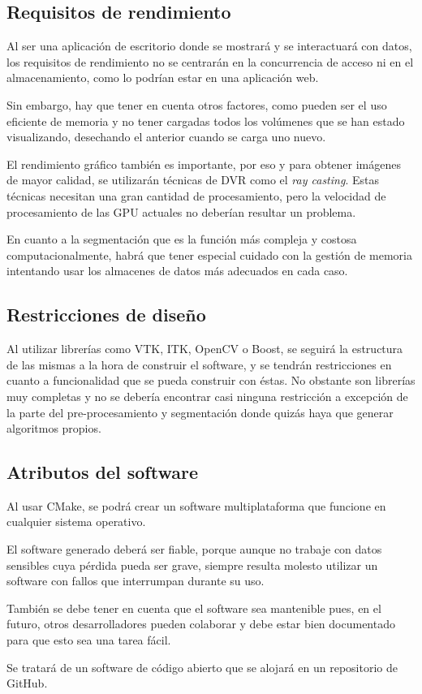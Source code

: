 \subsection{Requisitos de rendimiento}

Al ser una aplicación de escritorio donde se mostrará y se interactuará con datos, los requisitos de rendimiento no se centrarán en la concurrencia de acceso ni en el almacenamiento, como lo podrían estar en una aplicación web.

Sin embargo, hay que tener en cuenta otros factores, como pueden ser el uso eficiente de memoria y no tener cargadas todos los volúmenes que se han estado visualizando, desechando el anterior cuando se carga uno nuevo.

El rendimiento gráfico también es importante, por eso y para obtener imágenes de mayor calidad, se utilizarán técnicas de DVR como el \textit{ray casting}. Estas técnicas necesitan una gran cantidad de procesamiento, pero la velocidad de procesamiento de las GPU actuales no deberían resultar un problema.

En cuanto a la segmentación que es la función más compleja y costosa computacionalmente, habrá que tener especial cuidado con la gestión de memoria intentando usar los almacenes de datos más adecuados en cada caso.

\subsection{Restricciones de diseño}

Al utilizar librerías como VTK, ITK, OpenCV o Boost, se seguirá la estructura de las mismas a la hora de construir el software, y se tendrán restricciones en cuanto a funcionalidad que se pueda construir con éstas. No obstante son librerías muy completas y no se debería encontrar casi ninguna restricción a excepción de la parte del pre-procesamiento y segmentación donde quizás haya que generar algoritmos propios.

\subsection{Atributos del software}

Al usar CMake, se podrá crear un software multiplataforma que funcione en cualquier sistema operativo.

El software generado deberá ser fiable, porque aunque no trabaje con datos sensibles cuya pérdida pueda ser grave, siempre resulta molesto utilizar un software con fallos que interrumpan durante su uso.

También se debe tener en cuenta que el software sea mantenible pues, en el futuro, otros desarrolladores pueden colaborar y debe estar bien documentado para que esto sea una tarea fácil.

Se tratará de un software de código abierto que se alojará en un repositorio de GitHub.
